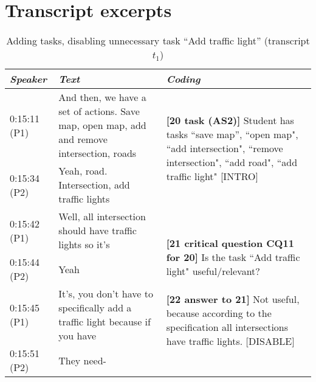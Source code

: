 \section{Transcript excerpts}
\label{sect:transcripts:excerpts}

\begin{table}[!htbp]
\centering
\begin{tabular}{|p{17mm}|p{63mm}|p{70mm}|}
\hline
\textit{Speaker} & \textit{Text} & \textit{Coding}\\
\hline
0:15:11 (P1) & And then, we have a set of actions. Save map, open map, add and remove intersection, roads & \multirow{2}{70mm}{\textbf{[20 task (AS2)]} Student has tasks ``save map'', ``open map", ``add intersection", ``remove intersection", ``add road", ``add traffic light" \textsf{[INTRO]}}\\
\cline{1-2}
0:15:34 (P2) & Yeah, road. Intersection, add traffic lights &\\
\hline
0:15:42 (P1) & Well, all intersection should have traffic lights so it's & \multirow{4}{70mm}{\textbf{[21 critical question CQ11 for 20]} Is the task ``Add traffic light" useful/relevant?\newline\newline
\textbf{[22 answer to 21]} Not useful, because according to the specification all intersections have traffic lights. \textsf{[DISABLE]}}\\
\cline{1-2}
0:15:44 (P2) & Yeah &\\
\cline{1-2}
0:15:45 (P1) & It's, you don't have to specifically add a traffic light because if you have &\\
\cline{1-2}
0:15:51 (P2)	& They need-&\\
\hline
\end{tabular}
\caption{Adding tasks, disabling unnecessary task ``Add traffic light'' (transcript $t_1$)}
\label{table:transcripts:traffic-light}


\end{table}
